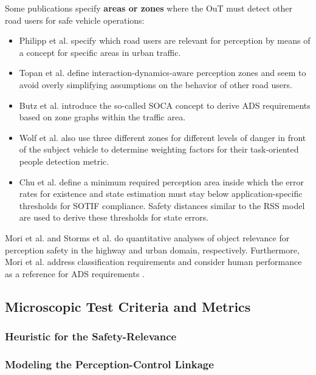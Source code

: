 \documentclass[conference]{IEEEtran}
\begin{document}
Some publications specify \textbf{areas or zones} where the OuT must detect other road users for safe vehicle operations: 
\begin{itemize}
\item Philipp et al. \cite{Philipp2022systematization} specify which road users are relevant for perception by means of a concept for specific areas in urban traffic.
\item Topan et al. \cite{Topan2022zones} define interaction-dynamics-aware perception zones and seem to avoid overly simplifying assumptions on the behavior of other road users.
\item Butz et al. \cite{Butz2020soca} introduce the so-called SOCA concept to derive ADS requirements based on zone graphs within the traffic area.
\item Wolf et al. \cite{Wolf2021people} also use three different zones for different levels of danger in front of the subject vehicle to determine weighting factors for their task-oriented people detection metric. 
\item Chu et al. \cite{Chu2023sotif} define a minimum required perception area inside which the error rates for existence and state estimation must stay below application-specific thresholds for SOTIF compliance. Safety distances similar to the RSS model are used to derive these thresholds for state errors.
\end{itemize}

Mori et al. \cite{Mori2023relevance} and Storms et al. \cite{Storms2023relevance} do quantitative analyses of object relevance for perception safety in the highway and urban domain, respectively.
Furthermore, Mori et al. \cite{Mori2023ClassificationRequirements} address classification requirements and consider human performance as a reference for ADS requirements \cite{Mori2023SHARPHumanAnalysis}. 

\subsection{Microscopic Test Criteria and Metrics} 
\label{sec:safety_metrics_micro}

\subsubsection{Heuristic for the Safety-Relevance}
\label{sec:heuristic_safety_relevance}



\subsubsection{Modeling the Perception-Control Linkage}
\label{sec:metrics_perc_control_linkage}
\end{document}
